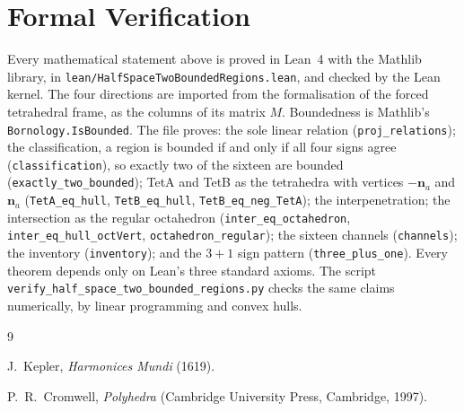 \documentclass[twocolumn]{iopjournal}
\begin{document}
\section*{Formal Verification}

Every mathematical statement above is proved in Lean~4 with the Mathlib library,
in \texttt{lean/HalfSpaceTwoBoundedRegions.lean}, and checked by the Lean
kernel. The four directions are imported from the formalisation of the
forced tetrahedral frame, as the columns of its matrix $M$. Boundedness is
Mathlib's \texttt{Bornology.IsBounded}. The file proves: the sole linear
relation (\texttt{proj\_relations}); the classification, a region is bounded
if and only if all four signs agree (\texttt{classification}), so exactly two
of the sixteen are bounded (\texttt{exactly\_two\_bounded}); TetA and TetB as
the tetrahedra with vertices $-\mathbf{n}_a$ and $\mathbf{n}_a$
(\texttt{TetA\_eq\_hull}, \texttt{TetB\_eq\_hull}, \texttt{TetB\_eq\_neg\_TetA});
the interpenetration; the intersection as the regular octahedron
(\texttt{inter\_eq\_octahedron}, \texttt{inter\_eq\_hull\_octVert},
\texttt{octahedron\_regular}); the sixteen channels (\texttt{channels}); the
inventory (\texttt{inventory}); and the $3+1$ sign pattern
(\texttt{three\_plus\_one}). Every theorem depends only on Lean's three
standard axioms. The script \texttt{verify\_half\_space\_two\_bounded\_regions.py}
checks the same claims numerically, by linear programming and convex hulls.

\begin{thebibliography}{9}

J.~Kepler,
\textit{Harmonices Mundi} (1619).

P.~R.~Cromwell,
\textit{Polyhedra}
(Cambridge University Press, Cambridge, 1997).

\end{thebibliography}
\end{document}
